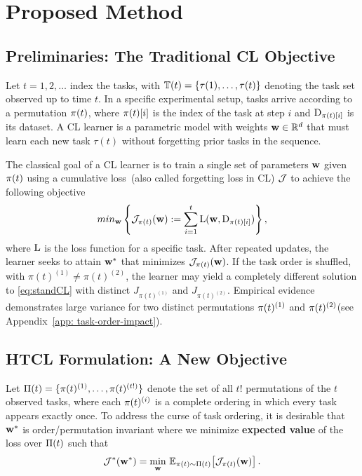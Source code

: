 \section{Proposed Method}
\label{sec:method}

\subsection{Preliminaries: The Traditional CL Objective}
Let $t=1,2,\ldots$ index the tasks, with $\mathbb{T}(t) = \{\tau(1), \ldots, \tau(t)\}$ denoting the task set observed up to time $t$. In a specific experimental setup, tasks arrive according to a permutation $\pi(t)$, where $\pi(t)[i]$ is the index of the task at step $i$ and $\mathrm{D}_{\pi(t)[i]}$ is its dataset. A CL learner is a parametric model with weights $\mathbf{w} \in \mathbb{R}^d$ that must learn each new task $\tau(t)$ without forgetting prior tasks in the sequence.

{The classical goal of a CL learner} is to train a single set of parameters $\mathbf{w}$ given $\pi(t)$ using a cumulative loss~(also called forgetting loss in CL) $\mathcal{J}$ to achieve the following objective 
\begin{align}
    \label{eq:standCL}
   min_{\mathbf{w}} \left\{ \mathcal{J}_{\pi(t)}{(\mathbf{w})} := \sum_{i=1}^{t} \mathrm{L}(\mathbf{w}, \mathrm{D}_{\pi(t)[i]}) \right\},
\end{align}
where $\mathrm{L}$ is the loss function for a specific task. After repeated updates, the learner seeks to attain $\mathbf{w}^{*}$ that minimizes $\mathcal{J}_{\pi(t)}(\mathbf{w})$. If the task order is shuffled, with $\pi(t)^{(1)} \ne \pi(t)^{(2)}$, the learner may yield a completely different solution %
to \eqref{eq:standCL} with distinct $J_{\pi(t)^{(1)}}$ and $J_{\pi(t)^{(2)}}$. Empirical evidence demonstrates large variance for two distinct permutations $\pi(t)^{(1)}$ and $\pi(t)^{(2)}$(see Appendix~\ref{app: task-order-impact}).

\subsection{HTCL Formulation: A New Objective}
\label{sec:problem_formulation}
Let $\Pi(t) = \{\pi(t)^{(1)}, \ldots, \pi(t)^{(t!)}\}$ denote the set of all $t!$ permutations of the $t$ observed tasks, where each $\pi(t)^{(i)}$ is a complete ordering in which every task appears exactly once. To address the curse of task ordering, it is desirable that $\mathbf{w}^{*}$ is order/permutation invariant where we minimize \textbf{expected value} of the loss over $\Pi(t)$ such that
\begin{align}
    \label{eq:tiCL}%
    \J^{*}(\wopt) = \min_{\w} \, \E_{\perm \sim \permset}\!\left[\J_{\perm}(\w)\right].
\end{align}

